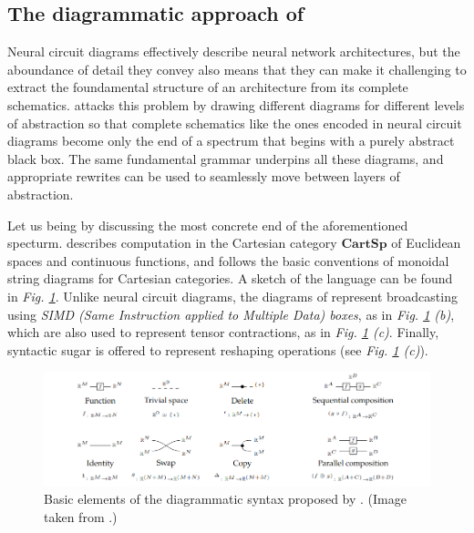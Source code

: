 \documentclass[11pt,a4paper,openright,twoside]{report}
\theoremstyle{plain}
\theoremstyle{definition}
\begin{document}
\subsection{The diagrammatic approach of \cite{khatri2024anatomy}}



Neural circuit diagrams effectively describe neural network architectures, but the aboundance of detail they convey also means that they can make it challenging to extract the foundamental structure of an architecture from its complete schematics.
\cite{khatri2024anatomy} attacks this problem by drawing different diagrams for different levels of abstraction so that complete schematics like the ones encoded in neural circuit diagrams become only the end of a spectrum that begins with a purely abstract black box. The same fundamental grammar underpins all these diagrams, and appropriate rewrites can be used to seamlessly move between layers of abstraction. 

Let us being by discussing the most concrete end of the aforementioned specturm. \cite{khatri2024anatomy} describes computation in the Cartesian category $\mathbf{CartSp}$ of Euclidean spaces and continuous functions, and follows the basic conventions of monoidal string diagrams for Cartesian categories. A sketch of the language can be found in \textit{Fig. \ref{fig: khatribasicdiagrams}}. Unlike neural circuit diagrams, the diagrams of \cite{khatri2024anatomy} represent broadcasting using \textit{SIMD (Same Instruction applied to Multiple Data) boxes}, as in \textit{Fig. \ref{fig: khatribasicdiagrams} (b)}, which are also used to represent tensor contractions, as in \textit{Fig. \ref{fig: khatribasicdiagrams} (c)}. Finally, syntactic sugar is offered to represent reshaping operations (see \textit{Fig. \ref{fig: khatribasicdiagrams} (c)}).

\begin{figure}[h]
  \begin{center}
    \includegraphics[width=\textwidth]{figures/khatri_diagrams.png}
    \caption[Diagrammatic syntax of \cite{khatri2024anatomy}]{Basic elements of the diagrammatic syntax proposed by \cite{khatri2024anatomy}. (Image taken from \cite{khatri2024anatomy}.)}
    \label{fig: khatribasicdiagrams}
  \end{center}
\end{figure}
\end{document}
